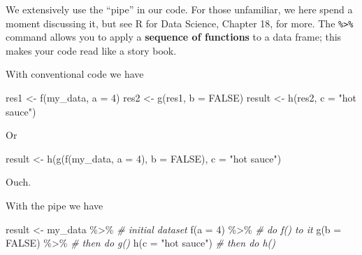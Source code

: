 \documentclass[
]{book}
\newenvironment{Shaded}{\begin{snugshade}}{\end{snugshade}}
\newcommand{\AttributeTok}[1]{\textcolor[rgb]{0.77,0.63,0.00}{#1}}
\newcommand{\CommentTok}[1]{\textcolor[rgb]{0.56,0.35,0.01}{\textit{#1}}}
\newcommand{\ConstantTok}[1]{\textcolor[rgb]{0.00,0.00,0.00}{#1}}
\newcommand{\DecValTok}[1]{\textcolor[rgb]{0.00,0.00,0.81}{#1}}
\newcommand{\FunctionTok}[1]{\textcolor[rgb]{0.00,0.00,0.00}{#1}}
\newcommand{\NormalTok}[1]{#1}
\newcommand{\OtherTok}[1]{\textcolor[rgb]{0.56,0.35,0.01}{#1}}
\newcommand{\SpecialCharTok}[1]{\textcolor[rgb]{0.00,0.00,0.00}{#1}}
\newcommand{\StringTok}[1]{\textcolor[rgb]{0.31,0.60,0.02}{#1}}
\begin{document}
We extensively use the ``pipe'' in our code.
For those unfamiliar, we here spend a moment discussing it, but see R for Data Science, Chapter 18, for more.
The \texttt{\%\textgreater{}\%} command allows you to apply a \textbf{sequence of functions} to a data frame; this makes your code read like a story book.

With conventional code we have

\begin{Shaded}
\begin{Highlighting}[]
\NormalTok{res1 }\OtherTok{\textless{}{-}} \FunctionTok{f}\NormalTok{(my\_data, }\AttributeTok{a =} \DecValTok{4}\NormalTok{)}
\NormalTok{res2 }\OtherTok{\textless{}{-}} \FunctionTok{g}\NormalTok{(res1, }\AttributeTok{b =} \ConstantTok{FALSE}\NormalTok{)}
\NormalTok{result }\OtherTok{\textless{}{-}} \FunctionTok{h}\NormalTok{(res2, }\AttributeTok{c =} \StringTok{"hot sauce"}\NormalTok{)}
\end{Highlighting}
\end{Shaded}

Or

\begin{Shaded}
\begin{Highlighting}[]
\NormalTok{result }\OtherTok{\textless{}{-}} \FunctionTok{h}\NormalTok{(}\FunctionTok{g}\NormalTok{(}\FunctionTok{f}\NormalTok{(my\_data, }\AttributeTok{a =} \DecValTok{4}\NormalTok{), }
              \AttributeTok{b =} \ConstantTok{FALSE}\NormalTok{), }
            \AttributeTok{c =} \StringTok{"hot sauce"}\NormalTok{)}
\end{Highlighting}
\end{Shaded}

Ouch.

With the pipe we have

\begin{Shaded}
\begin{Highlighting}[]
\NormalTok{result }\OtherTok{\textless{}{-}} 
\NormalTok{  my\_data }\SpecialCharTok{\%\textgreater{}\%}        \CommentTok{\# initial dataset}
  \FunctionTok{f}\NormalTok{(}\AttributeTok{a =} \DecValTok{4}\NormalTok{) }\SpecialCharTok{\%\textgreater{}\%}       \CommentTok{\# do f() to it}
  \FunctionTok{g}\NormalTok{(}\AttributeTok{b =} \ConstantTok{FALSE}\NormalTok{) }\SpecialCharTok{\%\textgreater{}\%}   \CommentTok{\# then do g()}
  \FunctionTok{h}\NormalTok{(}\AttributeTok{c =} \StringTok{"hot sauce"}\NormalTok{) }\CommentTok{\# then do h()}
\end{Highlighting}
\end{Shaded}
\end{document}
